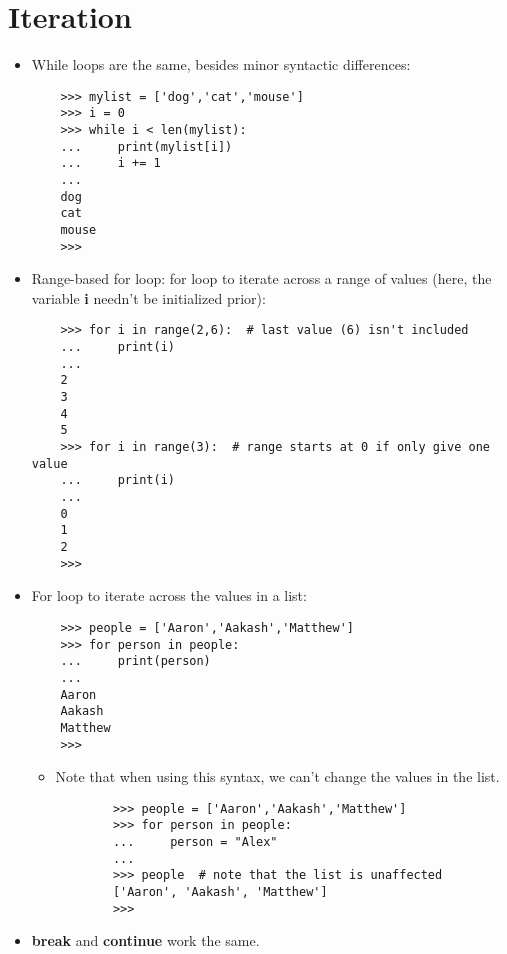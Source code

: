 \documentclass{article}
\begin{document}
\section{Iteration}
\begin{itemize}
    \item While loops are the same, besides minor syntactic differences:
    \begin{lstlisting}
    >>> mylist = ['dog','cat','mouse']
    >>> i = 0
    >>> while i < len(mylist):
    ...     print(mylist[i])
    ...     i += 1
    ... 
    dog
    cat
    mouse
    >>> 
    \end{lstlisting}
    \item Range-based for loop: for loop to iterate across a range of values (here, the variable \textbf{i} needn't be initialized prior):
    \label{sec:range-based-for-loop}
    \begin{lstlisting}
    >>> for i in range(2,6):  # last value (6) isn't included
    ...     print(i)
    ... 
    2
    3
    4
    5
    >>> for i in range(3):  # range starts at 0 if only give one value
    ...     print(i)
    ... 
    0
    1
    2
    >>> 
    \end{lstlisting}
    \item For loop to iterate across the values in a list:
    \begin{lstlisting}
    >>> people = ['Aaron','Aakash','Matthew']
    >>> for person in people:
    ...     print(person)
    ... 
    Aaron
    Aakash
    Matthew
    >>>
    \end{lstlisting}
    \begin{itemize}
        \item Note that when using this syntax, we can't change the values in the list.
        \begin{lstlisting}
        >>> people = ['Aaron','Aakash','Matthew']
        >>> for person in people:
        ...     person = "Alex"
        ... 
        >>> people  # note that the list is unaffected
        ['Aaron', 'Aakash', 'Matthew']
        >>> 
        \end{lstlisting}
    \end{itemize}
    \item \textbf{break} and \textbf{continue} work the same.
\end{itemize}
\end{document}
